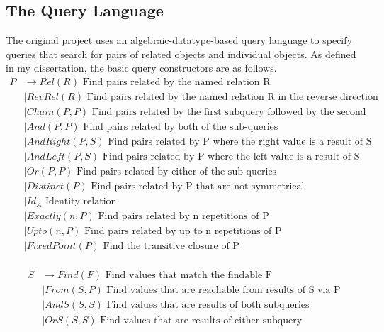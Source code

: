 \documentclass{report}
\newcommand \2[0]{\textbf{2}}
\newcommand \3[0]{\textbf{3}}
\begin{document}
\subsection{The Query Language}
The original project uses an algebraic-datatype-based query language to specify queries that search for pairs of related objects and individual objects. As defined in my dissertation, the basic query constructors are as follows.
\begin{equation}
    \label{PDefinition}
    \begin{split}
    P  &\rightarrow Rel(R) \mbox{ Find pairs related by the named relation R}\\
    &\mid RevRel(R) \mbox{ Find pairs related by the named relation R in the reverse direction}\\
    &\mid Chain(P, P) \mbox{   Find pairs related by the first subquery followed by the second}\\
    &\mid And(P, P) \mbox{  Find pairs related by both of the sub-queries}\\
    &\mid AndRight(P, S) \mbox{  Find pairs related by P where the right value is a result of S}\\
    &\mid AndLeft(P, S) \mbox{  Find pairs related by P where the left value is a result of S}\\
    &\mid Or(P, P) \mbox{  Find pairs related by either of the sub-queries}\\
    &\mid Distinct(P) \mbox{  Find pairs related by P that are not symmetrical}\\
    &\mid Id_A \mbox{ Identity relation}\\
    &\mid Exactly(\mathit{n}, P) \mbox{  Find pairs related by n repetitions of P}\\
    &\mid Upto(\mathit{n}, P) \mbox{  Find pairs related by up to n repetitions of P}\\
    &\mid FixedPoint(P) \mbox{  Find the transitive closure of P}\\
    \end{split}
    \end{equation} 

    \begin{equation}
        \label{SDefinition}
        \begin{split}
        S & \rightarrow Find(F) \mbox{ Find values that match the findable F}\\
        &\mid From(S, P) \mbox{ Find values that are reachable from results of S via P}\\
        &\mid AndS(S, S) \mbox{ Find values that are results of both subqueries}\\
        &\mid OrS(S, S) \mbox{ Find values that are results of either subquery}
        \end{split}
    \end{equation} 
\end{document}
